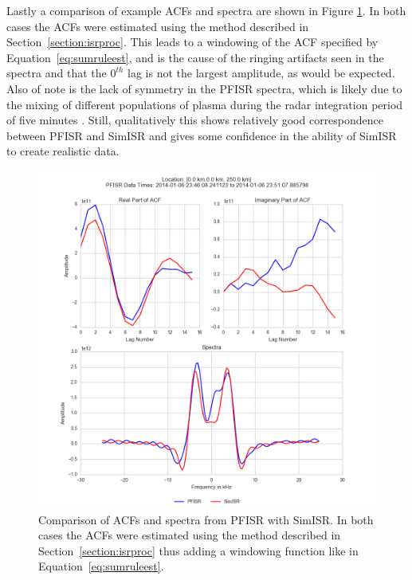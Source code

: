 Lastly a comparison of example ACFs and spectra are shown in Figure \ref{fig:simisrspectcom}. In both cases the ACFs were estimated using the method described in Section~\ref{section:isrproc}. This leads to a windowing of the ACF specified by Equation~\ref{eq:sumruleest}, and is the cause of the ringing artifacts seen in the spectra and that the $0^{th}$ lag is not the largest amplitude, as would be expected. Also of note is the lack of symmetry in the PFISR spectra, which is likely due to the mixing of different populations of plasma during the radar integration period of five minutes \cite{knudsen1993}. Still, qualitatively this shows relatively good correspondence between PFISR and SimISR and gives some confidence in the ability of SimISR to create realistic data. 

\begin{figure}[h!]
\centering
\includegraphics[width=4.5in]{speccomp}
\caption{Comparison of ACFs and spectra from PFISR with SimISR. In both cases the ACFs were estimated using the method described in Section~\ref{section:isrproc} thus adding a windowing function like in Equation~\ref{eq:sumruleest}.}
\label{fig:simisrspectcom}
\end{figure}


